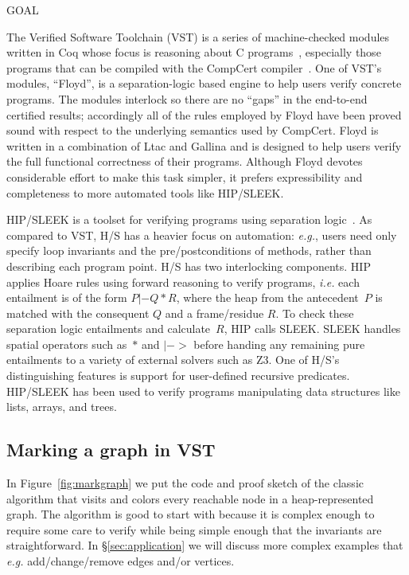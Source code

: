 GOAL

The Verified Software Toolchain (VST) is a series of machine-checked modules written in Coq whose focus is reasoning about C programs~\cite{appel:programlogics}, especially those programs that can be compiled with the CompCert compiler~\cite{leroy:compcert}.  One of VST's modules, ``Floyd'', is a separation-logic based engine to help users
verify concrete programs.  The modules interlock so there are no ``gaps'' in the end-to-end certified results; accordingly all of the rules employed by Floyd have been proved sound with respect to the underlying semantics used by CompCert.  Floyd is written in a combination of Ltac and Gallina and is designed to help users verify the full functional correctness of their programs.  Although Floyd devotes considerable effort to make this task simpler, it prefers expressibility and completeness to more automated tools like HIP/SLEEK.

HIP/SLEEK is a toolset for verifying programs using separation logic~\cite{chin:hipsleek}.  As compared to VST, H/S has a heavier focus on automation: \emph{e.g.}, users need only specify loop invariants and the pre/postconditions of methods, rather than describing each program point.  H/S has two interlocking components.  HIP applies Hoare rules using forward reasoning to verify programs, \emph{i.e.} each entailment is of the form $P |- Q * R$, where the heap from the antecedent~$P$ is matched with the consequent $Q$ and a frame/residue $R$. To check these separation logic entailments and calculate~$R$, HIP calls SLEEK.  SLEEK handles spatial operators such as~$*$ and $|->$ before handing any remaining pure entailments to a variety of external solvers such as Z3.  One of H/S's distinguishing features is support for user-defined recursive predicates.  HIP/SLEEK has been used to verify programs manipulating data structures like lists, arrays, and trees.

\subsection{Marking a graph in VST}



In Figure~\ref{fig:markgraph} we put the code and proof sketch of the classic  algorithm that visits and colors every reachable node in a heap-represented graph.  The  algorithm is good to start with because it is complex enough to require some care to verify while being simple enough that the invariants are straightforward.  In \S\ref{sec:application} we will discuss more complex examples that \emph{e.g.} add/change/remove edges and/or vertices.

